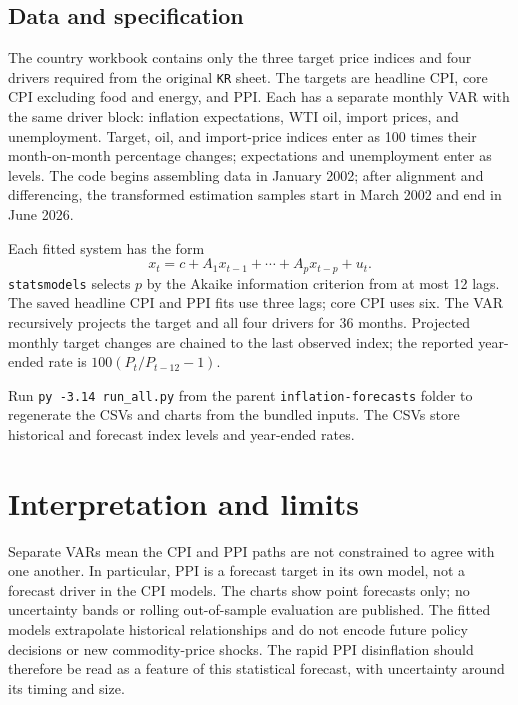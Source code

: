 \documentclass[11pt,a4paper]{article}
\begin{document}
\subsection{Data and specification}
The country workbook contains only the three target price indices and four drivers required from the original \texttt{KR} sheet. The targets are headline CPI, core CPI excluding food and energy, and PPI. Each has a separate monthly VAR with the same driver block: inflation expectations, WTI oil, import prices, and unemployment. Target, oil, and import-price indices enter as 100 times their month-on-month percentage changes; expectations and unemployment enter as levels. The code begins assembling data in January 2002; after alignment and differencing, the transformed estimation samples start in March 2002 and end in June 2026.

Each fitted system has the form
\[
  x_t=c+A_1x_{t-1}+\cdots+A_px_{t-p}+u_t.
\]
\texttt{statsmodels} selects $p$ by the Akaike information criterion from at most 12 lags. The saved headline CPI and PPI fits use three lags; core CPI uses six. The VAR recursively projects the target and all four drivers for 36 months. Projected monthly target changes are chained to the last observed index; the reported year-ended rate is $100(P_t/P_{t-12}-1)$.

Run \texttt{py -3.14 run\_all.py} from the parent \texttt{inflation-forecasts} folder to regenerate the CSVs and charts from the bundled inputs. The CSVs store historical and forecast index levels and year-ended rates.

\section{Interpretation and limits}
Separate VARs mean the CPI and PPI paths are not constrained to agree with one another. In particular, PPI is a forecast target in its own model, not a forecast driver in the CPI models. The charts show point forecasts only; no uncertainty bands or rolling out-of-sample evaluation are published. The fitted models extrapolate historical relationships and do not encode future policy decisions or new commodity-price shocks. The rapid PPI disinflation should therefore be read as a feature of this statistical forecast, with uncertainty around its timing and size.
\end{document}
